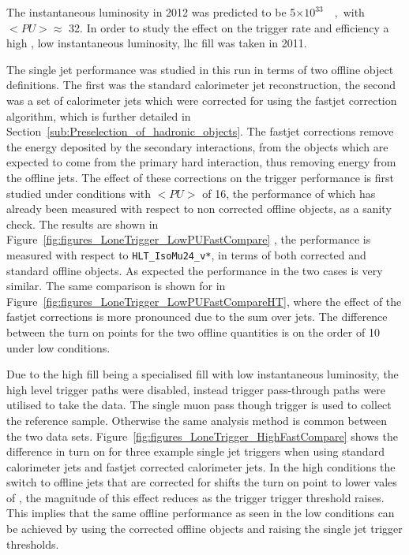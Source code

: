 The instantaneous luminosity in 2012 was predicted to be \unit{5$\times 10 ^{33}$}{\lumiunits}, with $<PU> \approx$ 32. In order to study the effect on the trigger rate and efficiency a high \pu, low instantaneous luminosity, \ac{lhc} fill was taken in 2011.

The \Lone single jet performance was studied in this run in terms of two 
offline object definitions. The first was the standard \AK calorimeter jet 
reconstruction, the second was a set of \AK calorimeter jets which were 
corrected for \pu using the fastjet correction algorithm, which is further 
detailed in Section~\ref{sub:Preselection_of_hadronic_objects}.
The fastjet corrections remove the energy deposited by the secondary 
interactions, from the objects which are expected to come from the primary hard 
interaction, thus removing energy from the offline jets.
The effect of these \pu corrections on the \Lone trigger performance is 
first studied under conditions with $<PU>$ of 16, the performance of which has 
already been measured with respect to non \pu corrected offline objects, as 
a sanity check. The results are shown in 
Figure~\ref{fig:figures_LoneTrigger_LowPUFastCompare} , the performance is 
measured with respect to \verb|HLT_IsoMu24_v*|, in terms of both \pu 
corrected and standard offline objects. As expected the performance in the two 
cases is very similar. The same comparison is shown for \HT in 
Figure~\ref{fig:figures_LoneTrigger_LowPUFastCompareHT}, where the effect of 
the fastjet\cite{Cacciari:2011ma} corrections is more pronounced due to the 
sum over jets. The difference between the turn on points for the two offline 
quantities is on the order of \unit{10}{\GeV} under low \pu conditions.

Due to the high \pu fill being a specialised fill with low instantaneous 
luminosity, the high level trigger paths were disabled, instead \Lone trigger 
pass-through paths were utilised to take the data. The \Lone single muon pass 
though trigger is used to collect the reference sample. Otherwise the same 
analysis method is common between the two data sets.
Figure~\ref{fig:figures_LoneTrigger_HighFastCompare} shows the difference in 
turn on for three example \Lone single jet triggers when using standard 
calorimeter jets and fastjet corrected calorimeter jets.
In the high \pu conditions the switch to offline jets that are corrected 
for \pu shifts the turn on point to lower vales of \ET, the magnitude of 
this effect reduces as the \Lone trigger trigger threshold raises. This implies 
that the same offline performance as seen in the low \pu conditions can be 
achieved by using the \pu corrected offline objects and raising the \Lone 
single jet trigger thresholds.

